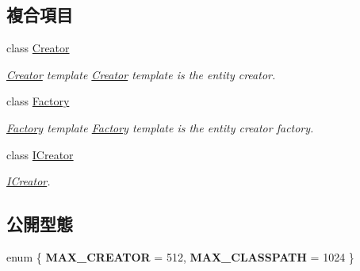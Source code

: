 \subsection*{複合項目}
\begin{DoxyCompactItemize}
\item 
class \hyperlink{class_magnum_1_1_entity_1_1_creator}{Creator}
\begin{DoxyCompactList}\small\item\em \hyperlink{class_magnum_1_1_entity_1_1_creator}{Creator} template \hyperlink{class_magnum_1_1_entity_1_1_creator}{Creator} template is the entity creator. \end{DoxyCompactList}\item 
class \hyperlink{class_magnum_1_1_entity_1_1_factory}{Factory}
\begin{DoxyCompactList}\small\item\em \hyperlink{class_magnum_1_1_entity_1_1_factory}{Factory} template \hyperlink{class_magnum_1_1_entity_1_1_factory}{Factory} template is the entity creator factory. \end{DoxyCompactList}\item 
class \hyperlink{class_magnum_1_1_entity_1_1_i_creator}{I\+Creator}
\begin{DoxyCompactList}\small\item\em \hyperlink{class_magnum_1_1_entity_1_1_i_creator}{I\+Creator}. \end{DoxyCompactList}\end{DoxyCompactItemize}
\subsection*{公開型態}
\begin{DoxyCompactItemize}
\item 
enum \{ {\bfseries M\+A\+X\+\_\+\+C\+R\+E\+A\+T\+OR} = 512, 
{\bfseries M\+A\+X\+\_\+\+C\+L\+A\+S\+S\+P\+A\+TH} = 1024
 \}\hypertarget{class_magnum_1_1_entity_ae537ac5fe6bf7f38bb2633ecfd4db93b}{}\label{class_magnum_1_1_entity_ae537ac5fe6bf7f38bb2633ecfd4db93b}

\end{DoxyCompactItemize}
